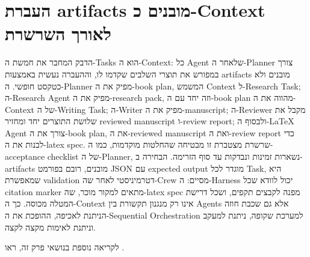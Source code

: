 \section{העברת artifacts מובנים כ-Context לאורך השרשרת}
הדבק המחבר את חמשת ה-Tasks הוא ה-Context: כל Agent שלאחר ה-Planner צורך במפורש את תוצרי השלבים שקדמו לו, וההעברה נעשית באמצעות artifacts מובנים ולא כטקסט חופשי. ה-Planner מפיק את ה-book plan, המשמש Context ל-Research Task; ה-Research Agent מפיק את ה-research pack, וזה יחד עם ה-book plan מהווה את ה-Context של ה-Writing Task; ה-Writer מפיק את ה-manuscript; ה-Reviewer מקבל את שלושת התוצרים יחד ומחזיר reviewed manuscript ו-review report; ולבסוף ה-LaTeX Agent צורך את ה-book plan, את ה-reviewed manuscript ואת ה-review report כדי לבנות את ה-latex spec. שרשרת מצטברת זו מבטיחה שהחלטות מוקדמות, כמו ה-acceptance checklist של ה-Planner, נשארות זמינות ונבדקות עד סוף הזרימה. הבחירה ב-artifacts מובנים, רובם בפורמט JSON עם expected output מוגדר לכל Task, היא שמאפשרת validation דטרמיניסטי לאחר שה-Crew מסיים: ה-Harness יכול לוודא שכל citation marker מתאים למקור מוכר, שה-latex spec מפנה לקבצים תקפים, ושכל דרישת המטלה מכוסה. כך ה-Context אינו רק מנגנון תקשורת בין Agents אלא גם שכבת חוזה הניתנת לאכיפה, ההופכת את ה-Sequential Orchestration למערכת שקופה, ניתנת למעקב וניתנת לאימות מקצה לקצה.

לקריאה נוספת בנושאי פרק זה, ראו \cite{latex_project}.

